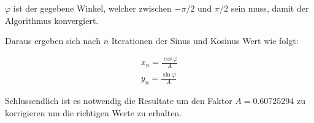 \(\varphi\) ist der gegebene Winkel, welcher zwischen \(-\pi/2\) und \(\pi/2\) sein muss, damit der Algorithmus konvergiert.

Daraus ergeben sich nach \(n\) Iterationen der Sinus und Kosinus Wert wie folgt:

\begin{equation}
\begin{aligned}
x_n = \frac{\cos{\varphi}}{A} \\
y_n = \frac{\sin{\varphi}}{A}
\end{aligned}
\label{equ:cordic_6}
\end{equation} 

Schlussendlich ist es notwendig die Resultate um den Faktor \(A = 0.60725294\) zu korrigieren um die richtigen Werte zu erhalten.

